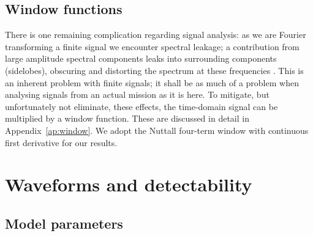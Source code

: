 \documentclass[useAMS,usedcolumn,usegraphicx,usenatbib]{mn2e}
\newcommand{\apref}[1]{Appendix~\ref{ap:#1}}
\begin{document}
\subsection{Window functions}

There is one remaining complication regarding signal analysis: as we are Fourier transforming a finite signal we encounter spectral leakage; a contribution from large amplitude spectral components leaks into surrounding components (sidelobes), obscuring and distorting the spectrum at these frequencies \citep{Harris1978}. This is an inherent problem with finite signals; it shall be as much of a problem when analysing signals from an actual mission as it is here. To mitigate, but unfortunately not eliminate, these effects, the time-domain signal can be multiplied by a window function. These are discussed in detail in \apref{window}. We adopt the Nuttall four-term window with continuous first derivative \citep{Nuttall1981} for our results.

\section{Waveforms and detectability}\label{sec:Waveforms}

\subsection{Model parameters}
\end{document}
